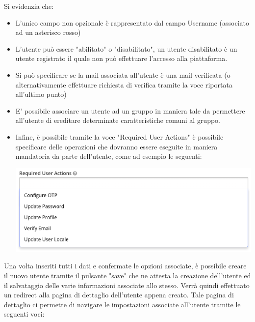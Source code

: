 \documentclass[twoside]{report}
\begin{document}
Si evidenzia che:
\begin{itemize}
\item L'unico campo non opzionale è rappresentato dal campo Username (associato ad un asterisco rosso)
\item L'utente può essere "abilitato" o "disabilitato", un utente disabilitato è un utente registrato il quale non può effettuare l'accesso alla piattaforma.
\item Si può specificare se la mail associata all'utente è una mail verificata (o alternativamente effettuare richiesta di verifica tramite la voce riportata all'ultimo punto)
\item E' possibile associare un utente ad un gruppo in maniera tale da permettere all'utente di ereditare determinate caratteristiche comuni al gruppo.
\item Infine, è possibile tramite la voce "Required User Actions" è possibile specificare delle operazioni che dovranno essere eseguite in maniera mandatoria da parte dell'utente, come ad esempio le seguenti:
	\begin{center}
    \begin{minipage}{0.7\linewidth}
        \vspace{2mm}
        \centering
        \includegraphics[width= \linewidth]{7.png}
        \vspace{2mm}
    \end{minipage}
    \end{center}
\end{itemize}
Una volta inseriti tutti i dati e confermate le opzioni associate, è possibile creare il nuovo utente tramite il pulsante "save" che ne attesta la creazione dell'utente ed il salvataggio delle varie informazioni associate allo stesso.
\bigbreak
Verrà quindi effettuato un redirect alla pagina di dettaglio dell'utente appena creato. Tale pagina di dettaglio ci permette di navigare le impostazioni associate all'utente tramite le seguenti voci:
\end{document}
